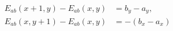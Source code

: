 \documentclass[border=6pt]{standalone}
\begin{document}
\color{white}
\(\displaystyle
\begin{aligned}
E_{ab}(x+1,y)-E_{ab}(x,y) &= b_y-a_y,\\
E_{ab}(x,y+1)-E_{ab}(x,y) &= -(b_x-a_x)
\end{aligned}
\)
\end{document}
